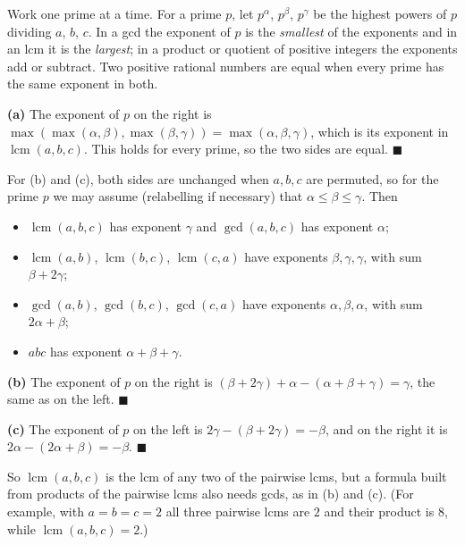 Work one prime at a time. For a prime $p$, let $p^\alpha$, $p^\beta$, $p^\gamma$ be the highest powers of $p$ dividing $a$, $b$, $c$. In a gcd the exponent of $p$ is the \emph{smallest} of the exponents and in an lcm it is the \emph{largest}; in a product or quotient of positive integers the exponents add or subtract. Two positive rational numbers are equal when every prime has the same exponent in both.

\textbf{(a)} The exponent of $p$ on the right is $\max\left(\max(\alpha,\beta),\max(\beta,\gamma)\right)=\max(\alpha,\beta,\gamma)$, which is its exponent in $\operatorname{lcm}(a,b,c)$. This holds for every prime, so the two sides are equal. $\blacksquare$

For (b) and (c), both sides are unchanged when $a,b,c$ are permuted, so for the prime $p$ we may assume (relabelling if necessary) that $\alpha\le\beta\le\gamma$. Then
\begin{itemize}
\item $\operatorname{lcm}(a,b,c)$ has exponent $\gamma$ and $\gcd(a,b,c)$ has exponent $\alpha$;
\item $\operatorname{lcm}(a,b)$, $\operatorname{lcm}(b,c)$, $\operatorname{lcm}(c,a)$ have exponents $\beta,\gamma,\gamma$, with sum $\beta+2\gamma$;
\item $\gcd(a,b)$, $\gcd(b,c)$, $\gcd(c,a)$ have exponents $\alpha,\beta,\alpha$, with sum $2\alpha+\beta$;
\item $abc$ has exponent $\alpha+\beta+\gamma$.
\end{itemize}

\textbf{(b)} The exponent of $p$ on the right is $(\beta+2\gamma)+\alpha-(\alpha+\beta+\gamma)=\gamma$, the same as on the left. $\blacksquare$

\textbf{(c)} The exponent of $p$ on the left is $2\gamma-(\beta+2\gamma)=-\beta$, and on the right it is $2\alpha-(2\alpha+\beta)=-\beta$. $\blacksquare$

So $\operatorname{lcm}(a,b,c)$ is the lcm of any two of the pairwise lcms, but a formula built from products of the pairwise lcms also needs gcds, as in (b) and (c). (For example, with $a=b=c=2$ all three pairwise lcms are $2$ and their product is $8$, while $\operatorname{lcm}(a,b,c)=2$.)
